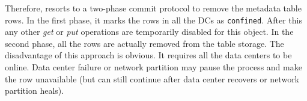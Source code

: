 Therefore, {\name} resorts to a two-phase commit protocol to remove the metadata table rows.
In the first phase, it marks the rows in all the DCs as \texttt{confined}.
After this any other {\em get} or {\em put} operations are temporarily disabled
for this object. In the second phase, all the rows are actually removed
from the table storage. The disadvantage of this approach is obvious. It
requires all the data centers to be online. Data center failure or network
partition may pause the process and make the row unavailable (but can still
continue after data center recovers or network partition heals).  


